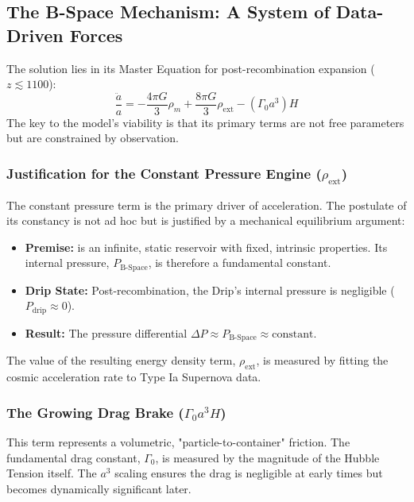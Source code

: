 \documentclass{BSpacePaper} %
\begin{document}
\begin{appendices}
\subsection{The B-Space Mechanism: A System of Data-Driven Forces}
The \bspace{} solution lies in its Master Equation for post-recombination expansion ($z \lesssim 1100$):
\begin{equation}
    \frac{\ddot{a}}{a} = -\frac{4\pi G}{3}\rho_m + \frac{8\pi G}{3}\rho_{\text{ext}} - \left(\Gamma_0 a^3\right) H
\end{equation}
The key to the model's viability is that its primary terms are not free parameters but are constrained by observation.

\subsubsection{Justification for the Constant Pressure Engine ($\rho_{\text{ext}}$)}
The constant pressure term is the primary driver of acceleration. The postulate of its constancy is not ad hoc but is justified by a mechanical equilibrium argument:
\begin{itemize}
    \item \textbf{Premise:} \bspace{} is an infinite, static reservoir with fixed, intrinsic properties. Its internal pressure, $P_{\text{B-Space}}$, is therefore a fundamental constant.
    \item \textbf{Drip State:} Post-recombination, the Drip's internal pressure is negligible ($P_{\text{drip}} \approx 0$).
    \item \textbf{Result:} The pressure differential $\Delta P \approx P_{\text{B-Space}} \approx \text{constant}$.
\end{itemize}
The value of the resulting energy density term, $\rho_{\text{ext}}$, is measured by fitting the cosmic acceleration rate to Type Ia Supernova data.

\subsubsection{The Growing Drag Brake ($\Gamma_0 a^3 H$)}
This term represents a volumetric, "particle-to-container" friction. The fundamental drag constant, $\Gamma_0$, is measured by the magnitude of the Hubble Tension itself. The $a^3$ scaling ensures the drag is negligible at early times but becomes dynamically significant later.


\end{appendices}
\end{document}
